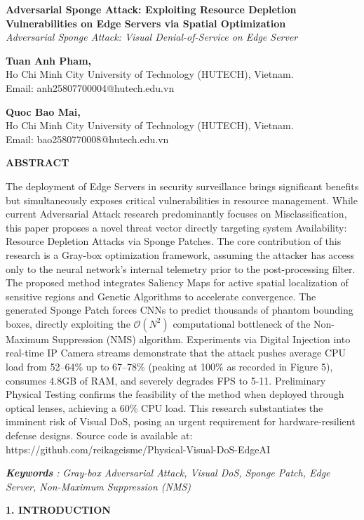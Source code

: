 \documentclass[]{article}
\author{}
\date{}
\begin{document}
\textbf{Adversarial Sponge Attack: Exploiting Resource Depletion Vulnerabilities on Edge Servers via Spatial Optimization}\\
\emph{Adversarial Sponge Attack: Visual Denial-of-Service on Edge Server}

\textbf{Tuan Anh Pham,}\\
Ho Chi Minh City University of Technology (HUTECH), Vietnam.\\
Email: anh25807700004@hutech.edu.vn

\textbf{Quoc Bao Mai,}\\
Ho Chi Minh City University of Technology (HUTECH), Vietnam.\\
Email: bao2580770008@hutech.edu.vn

\textbf{ABSTRACT}

The deployment of Edge Servers in security surveillance brings significant benefits but simultaneously exposes critical vulnerabilities in resource management. While current Adversarial Attack research predominantly focuses on Misclassification, this paper proposes a novel threat vector directly targeting system Availability: Resource Depletion Attacks via Sponge Patches. The core contribution of this research is a Gray-box optimization framework, assuming the attacker has access only to the neural network's internal telemetry prior to the post-processing filter. The proposed method integrates Saliency Maps for active spatial localization of sensitive regions and Genetic Algorithms to accelerate convergence. The generated Sponge Patch forces CNNs to predict thousands of phantom bounding boxes, directly exploiting the \(\mathcal{O}\left( N^{2} \right)\) computational bottleneck of the Non-Maximum Suppression (NMS) algorithm. Experiments via Digital Injection into real-time IP Camera streams demonstrate that the attack pushes average CPU load from 52--64\% up to 67--78\% (peaking at 100\% as recorded in Figure 5), consumes 4.8GB of RAM, and severely degrades FPS to 5-11. Preliminary Physical Testing confirms the feasibility of the method when deployed through optical lenses, achieving a 60\% CPU load. This research substantiates the imminent risk of Visual DoS, posing an urgent requirement for hardware-resilient defense designs. Source code is available at:
https://github.com/reikageisme/Physical-Visual-DoS-EdgeAI

\emph{\textbf{Keywords} :} \emph{Gray-box Adversarial Attack, Visual DoS, Sponge Patch, Edge Server, Non-Maximum Suppression (NMS)}

\textbf{1. INTRODUCTION}
\end{document}
